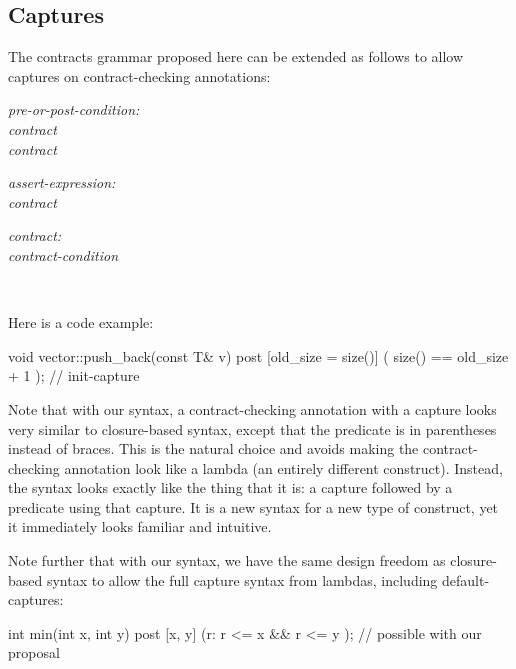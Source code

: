 \subsection{Captures}
\label{subsec:captures}

The contracts grammar proposed here can be extended as follows to allow captures on contract-checking annotations:

\begin{adjustwidth}{0.5cm}{0.5cm}

\emph{pre-or-post-condition:} \\
\phantom{~~~} \emph{contract} \\
\phantom{~~~} \emph{contract}

\emph{assert-expression:} \\
\phantom{~~~} \emph{contract}

\emph{contract:} \\
\phantom{~~~} \emph{contract-condition}

 \\
\phantom{~~~}

\end{adjustwidth}

Here is a code example:

\vspace{2mm}
\begin{codeblock}
void vector::push_back(const T& v)
  post [old_size = size()] ( size() == old_size + 1 );  // init-capture
\end{codeblock}
\vspace{2mm}

Note that with our syntax, a contract-checking annotation with a capture looks very similar to closure-based syntax, except that the predicate is in parentheses instead of braces. This is the natural choice and avoids making the contract-checking annotation look like a lambda (an entirely different construct). Instead, the syntax looks exactly like the thing that it is: a capture followed by a predicate using that capture. It is a new syntax for a new type of construct, yet it immediately looks familiar and intuitive.

Note further that with our syntax, we have the same design freedom as closure-based syntax \cite{P2461R1} to allow the full capture syntax from lambdas, including default-captures:

\vspace{2mm}
\begin{codeblock}
int min(int x, int y)
  post [x, y] (r: r <= x && r <= y );   // possible with our proposal
\end{codeblock}
\vspace{2mm}

